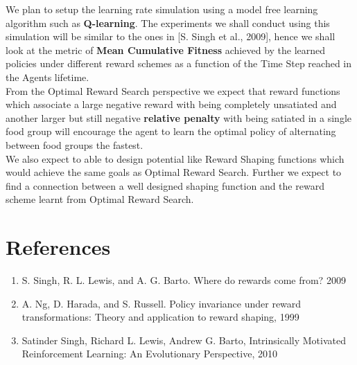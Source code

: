 \documentclass[11pt]{article}
\begin{document}
We plan to setup the learning rate simulation using a model free learning algorithm such as \textbf{Q-learning}. The experiments we shall conduct using this simulation will be similar to the ones in [S. Singh et al., 2009], hence we shall look at the metric of \textbf{Mean Cumulative Fitness} achieved by the learned policies under different reward schemes as a function of the Time Step reached in the Agents lifetime.\\
From the Optimal Reward Search perspective we expect that reward functions which associate a large negative reward with being completely unsatiated and another larger but still negative \textbf{relative penalty} with being satiated in a single food group will encourage the agent to learn the optimal policy of alternating between food groups the fastest.\\
We also expect to able to design potential like Reward Shaping functions which would achieve the same goals as Optimal Reward Search. Further we expect to find a connection between a well designed shaping function and the reward scheme learnt from Optimal Reward Search.

\section{References}

\begin{enumerate}
\item S. Singh, R. L. Lewis, and A. G. Barto. Where do rewards come from? 2009
\item A. Ng, D. Harada, and S. Russell. Policy invariance under reward transformations:
Theory and application to reward shaping, 1999
\item Satinder Singh, Richard L. Lewis, Andrew G. Barto, Intrinsically Motivated Reinforcement Learning:
An Evolutionary Perspective, 2010
\end{enumerate}
\end{document}

